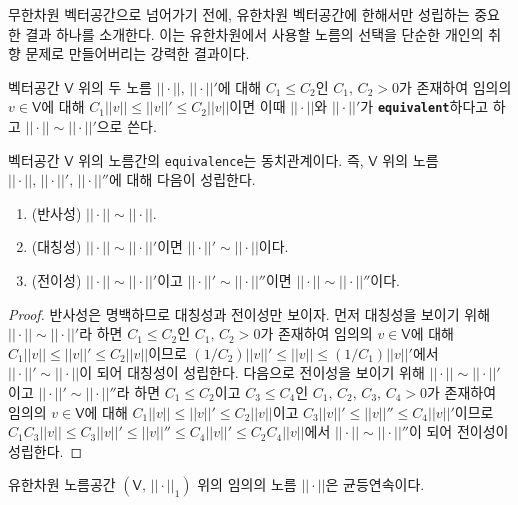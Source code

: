 무한차원 벡터공간으로 넘어가기 전에, 유한차원 벡터공간에 한해서만 성립하는 중요한 결과 하나를 소개한다. 이는 유한차원에서 사용할 노름의 선택을 단순한 개인의 취향 문제로 만들어버리는 강력한 결과이다.

\begin{definition}
    벡터공간 $\mathsf{V}$ 위의 두 노름 $||\cdot||,\,||\cdot||'$에 대해 $C_1\leq C_2$인 $C_1,\,C_2>0$가 존재하여 임의의 $v\in\mathsf{V}$에 대해 $C_1||v||\leq||v||'\leq C_2||v||$이면 이때 $||\cdot||$와 $||\cdot||'$가 \textbf{\texttt{equivalent}}하다고 하고 $||\cdot||\sim||\cdot||'$으로 쓴다. 
\end{definition}

\begin{proposition}\label{prop:normEquivalent}
    벡터공간 $\mathsf{V}$ 위의 노름간의 \texttt{equivalence}는 동치관계이다. 즉, $\mathsf{V}$ 위의 노름 $||\cdot||,\,||\cdot||',\,||\cdot||''$에 대해 다음이 성립한다.
    \begin{enumerate}
        \item (반사성) $||\cdot||\sim||\cdot||$.
        \item (대칭성) $||\cdot||\sim||\cdot||'$이면 $||\cdot||'\sim||\cdot||$이다.
        \item (전이성) $||\cdot||\sim||\cdot||'$이고 $||\cdot||'\sim||\cdot||''$이면 $||\cdot||\sim||\cdot||''$이다.
    \end{enumerate}
\end{proposition}

\begin{proof}
    반사성은 명백하므로 대칭성과 전이성만 보이자. 먼저 대칭성을 보이기 위해 $||\cdot||\sim||\cdot||'$라 하면 $C_1\leq C_2$인 $C_1,\,C_2>0$가 존재하여 임의의 $v\in\mathsf{V}$에 대해 $C_1||v||\leq||v||'\leq C_2||v||$이므로 $(1/C_2)||v||'\leq||v||\leq(1/C_1)||v||'$에서 $||\cdot||'\sim||\cdot||$이 되어 대칭성이 성립한다. 다음으로 전이성을 보이기 위해 $||\cdot||\sim||\cdot||'$이고 $||\cdot||'\sim||\cdot||''$라 하면 $C_1\leq C_2$이고 $C_3\leq C_4$인 $C_1,\,C_2,\,C_3,\,C_4>0$가 존재하여 임의의 $v\in\mathsf{V}$에 대해 $C_1||v||\leq||v||'\leq C_2||v||$이고 $C_3||v||'\leq||v||''\leq C_4||v||'$이므로 $C_1C_3||v||\leq C_3||v||'\leq||v||''\leq C_4||v||'\leq C_2C_4||v||$에서 $||\cdot||\sim||\cdot||''$이 되어 전이성이 성립한다.
\end{proof}

\begin{lemma}
    유한차원 노름공간 $(\mathsf{V},\,||\cdot||_1)$ 위의 임의의 노름 $||\cdot||$은 균등연속이다.
\end{lemma}


